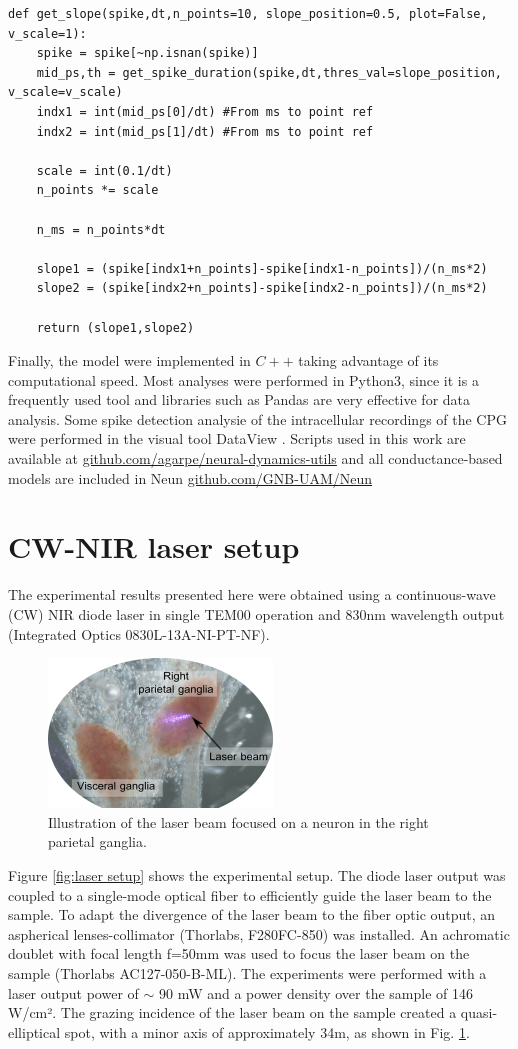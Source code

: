\begin{lstlisting}
def get_slope(spike,dt,n_points=10, slope_position=0.5, plot=False, v_scale=1):
	spike = spike[~np.isnan(spike)] 
	mid_ps,th = get_spike_duration(spike,dt,thres_val=slope_position, v_scale=v_scale)
	indx1 = int(mid_ps[0]/dt) #From ms to point ref
	indx2 = int(mid_ps[1]/dt) #From ms to point ref
	
	scale = int(0.1/dt)
	n_points *= scale
	
	n_ms = n_points*dt
	
	slope1 = (spike[indx1+n_points]-spike[indx1-n_points])/(n_ms*2) 
	slope2 = (spike[indx2+n_points]-spike[indx2-n_points])/(n_ms*2)

	return (slope1,slope2)
\end{lstlisting}

Finally, the model were implemented in $C++$ taking advantage of its computational speed. Most analyses were performed in Python3, since it is a frequently used tool and libraries such as Pandas are very effective for data analysis. Some spike detection analysie of the intracellular recordings of the CPG were performed in the visual tool DataView \parencite{heitler_dataview_2007}. Scripts used in this work are available at \href{https://github.com/agarpe/neural-dynamics-utils}{github.com/agarpe/neural-dynamics-utils} and all conductance-based models are included in Neun \href{https://github.com/GNB-UAM/Neun}{github.com/GNB-UAM/Neun}


\section{CW-NIR laser setup}
The experimental results presented here were obtained using a continuous-wave (CW) NIR diode laser in single TEM00 operation and 830nm wavelength output (Integrated Optics 0830L-13A-NI-PT-NF). 
\begin{figure}
    \centering
	\includegraphics{img/laser/laser-beam.png}
	\caption{Illustration of the laser beam focused on a neuron in the right parietal ganglia.}
	\label{fig:laser beam}
\end{figure} 
Figure \ref{fig:laser setup} shows the experimental setup. The diode laser output was coupled to a single-mode optical fiber to efficiently guide the laser beam to the sample. To adapt the divergence of the laser beam to the fiber optic output, an aspherical lenses-collimator (Thorlabs, F280FC-850) was installed. An achromatic doublet with focal length f=50mm was used to focus the laser beam on the sample (Thorlabs AC127-050-B-ML). The experiments were performed with a laser output power of $\sim$ 90 mW and a power density over the sample of 146 W/cm². The grazing incidence of the laser beam on the sample created a quasi-elliptical spot, with a minor axis of approximately 34{\textmu}m, as shown in Fig. \ref{fig:laser beam}.

